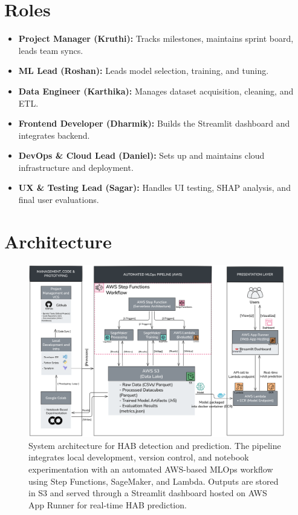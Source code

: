 \documentclass[12pt]{article}
\begin{document}
\section{Roles}
\begin{itemize}
  \item \textbf{Project Manager (Kruthi):} Tracks milestones, maintains sprint board, leads team syncs.
  \item \textbf{ML Lead (Roshan):} Leads model selection, training, and tuning.
  \item \textbf{Data Engineer (Karthika):} Manages dataset acquisition, cleaning, and ETL.
  \item \textbf{Frontend Developer (Dharmik):} Builds the Streamlit dashboard and integrates backend.
  \item \textbf{DevOps \& Cloud Lead (Daniel):} Sets up and maintains cloud infrastructure and deployment.
  \item \textbf{UX \& Testing Lead (Sagar):} Handles UI testing, SHAP analysis, and final user evaluations.
\end{itemize}



\section{Architecture}
\begin{figure}[H]
  \centering
  \includegraphics[width=\linewidth]{Project_Architecture_New.png}
  \caption{System architecture for HAB detection and prediction. The pipeline integrates local development, version control, and notebook experimentation with an automated AWS-based MLOps workflow using Step Functions, SageMaker, and Lambda. Outputs are stored in S3 and served through a Streamlit dashboard hosted on AWS App Runner for real-time HAB prediction.}
  \label{fig:hab-architecture}
\end{figure}
\end{document}
